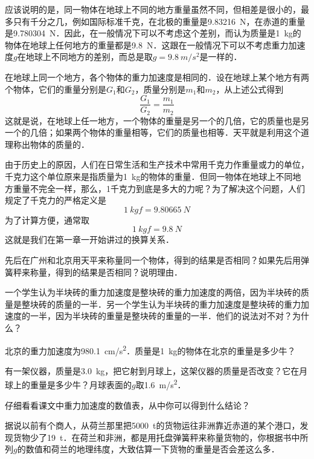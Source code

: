 \begin{Test}
应该说明的是，同一物体在地球上不同的地方重量虽然不同，但相差是很小的，最多只有千分之几，例如国际标准千克，在北极的重量是\SI{9.83216}{N}，在赤道的重量是\SI{9.780304}{N}．因此，在一般情况下可以不考虑这个差别，而认为质量是\SI{1}{kg}的物体在地球上任何地方的重量都是\SI{9.8}{N}．这跟在一般情况下可以不考虑重力加速度$g$在地球上不同地方的差别，而总是取$g=\SI{9.8}{m/s^2}$是一样的．

在地球上同一个地方，各个物体的重力加速度是相同的．设在地球上某个地方有两个物体，它们的重量分别是$G_1$和$G_2$，质量分别是$m_1$和$m_2$，从上述公式得到
\[\frac{G_1}{G_2}=\frac{m_1}{m_2} \]
这就是说，在地球上任一地方，一个物体的重量是另一个的几倍，它的质量也是另一个的几倍；如果两个物体的重量相等，它们的质量也相等．天平就是利用这个道理称出物体的质量的．

由于历史上的原因，人们在日常生活和生产技术中常用千克力作重量或力的单位，千克力这个单位原来是指质量为\SI{1}{kg}的物体的重量．但同一物体在地球上不同地方重量不完全一样，那么，1千克力到底是多大的力呢？为了解决这个问题，人们规定了千克力的严格定义是
\[\SI{1}{kgf}=\SI{9.80665}{N}\]
为了计算方便，通常取
\[\SI{1}{kgf}=\SI{9.8}{N}\]
这就是我们在第一章一开始讲过的换算关系．





\begin{Exercise}
	\begin{QsNum}
		\item 先后在广州和北京用天平来称量同一个物体，得到的结果是否相同？如果先后用弹簧秤来称量，得到的结果是否相同？说明理由．
		\item 一个学生认为半块砖的重力加速度是整块砖的重力加速度的两倍，因为半块砖的质量是整块砖的质量的一半．另一个学生认为半块砖的重力加速度是整块砖的重力加速度的一半，因为半块砖的重量是整块砖的重量的一半．他们的说法对不对？为什么？
		\item 北京的重力加速度为\SI{980.1}{cm/s^2}．质量是\SI{1}{kg}的物体在北京的重量是多少牛？
		\item 有一架仪器，质量是\SI{3.0}{kg}，把它射到月球上，这架仪器的质量是否改变？它在月球上的重量是多少牛？月球表面的$g$取\SI{1.6}{m/s^2}．
		\item 仔细看看课文中重力加速度的数值表，从中你可以得到什么结论？
		\item 据说以前有个商人，从荷兰那里把\SI{5000}{t}的货物运往非洲靠近赤道的某个港口，发现货物少了\SI{19}{t}．在荷兰和非洲，都是用托盘弹簧秤来称量货物的，你根据书中所列$g$的数值和荷兰的地理纬度，大致估算一下货物的重量是否会差这么多．
	\end{QsNum}
\end{Exercise}






\end{Test}
